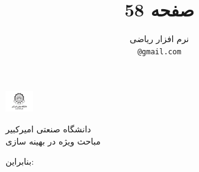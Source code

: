 \documentclass{article}
\title{صفحه 58}
\author{%
  
  نرم افزار ریاضی\\

  \texttt{@gmail.com} \\
}
\begin{document}
\baselineskip=0.7cm

\begin{minipage}{0.1\textwidth}%
\includegraphics[width=1.2cm]{Amirkabir.jpg}
\end{minipage}%
\hfill%
\begin{minipage}{0.9\textwidth}\raggedleft
دانشگاه صنعتی امیرکبیر\\
مباحث ویژه در بهینه سازی\\
\end{minipage}


\makepertitle


بنابراین:\\
\end{document}
